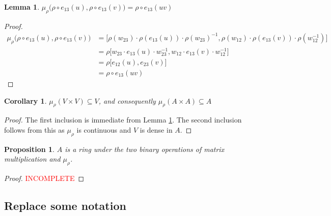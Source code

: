 \documentclass[12pt]{article}
\newtheorem{proposition}{Proposition}
\newtheorem{lemma}{Lemma}
\newtheorem{corollary}{Corollary}
\theoremstyle{definition}
\newcommand{\incomplete}{\textcolor{red}{INCOMPLETE}}
\newcommand{\inv}{^{-1}}
\begin{document}
\begin{lemma}
\label{multiplicative}
$\mu_\rho \Big( \rho \circ e_{13}(u) , \rho \circ e_{13}(v) \Big) = \rho \circ  e_{13}(uv)$
\end{lemma}
\begin{proof}
\begin{align*}
	\mu_\rho \Big( \rho \circ e_{13}(u) , \rho \circ e_{13}(v) \Big)  &= \Big[ \rho(w_{23}) \cdot \rho (e_{13}(u)) \cdot \rho(w_{23}) \inv, \rho(w_{12}) \cdot \rho(e_{13}(v)) \cdot \rho(w_{12} \inv) \Big] \\
&= \rho \Big[ w_{23} \cdot e_{13}(u) \cdot w_{23} \inv, w_{12} \cdot e_{13}(v) \cdot w_{12} \inv \Big] \\
&= \rho \Big[ e_{12}(u), e_{23}(v) \Big] \\
&=  \rho \circ  e_{13}(uv)
\end{align*}
\end{proof}

\begin{corollary}
$\mu_\rho(V \times V) \subseteq V$, and consequently $\mu_\rho(A \times A) \subseteq A$
\end{corollary}
\begin{proof}
The first inclusion is immediate from Lemma \ref{multiplicative}. The second inclusion follows from this as $\mu_\rho$ is continuous and $V$ is dense in $A$.
\end{proof}

\begin{proposition}
$A$ is a ring under the two binary operations of matrix multiplication and $\mu_\rho$.
\end{proposition}
\begin{proof}
\incomplete
\end{proof}

\newpage

\subsection{Replace some notation}
\end{document}

